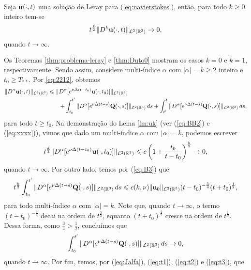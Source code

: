 \begin{tbox} \label{thm:leraygen}
    Seja $\mathbf{u}(\cdot,t)$ uma solução de Leray para (\ref{eq:navierstokes}), então, para todo $k \geqslant 0$ inteiro tem-se
    \[
        t^{\frac{k}{2}} \Vert D^k\mathbf{u}(\cdot,t) \Vert_{\mathcal{L}^2(\mathbb{R}^3)} \to 0,
    \]
    quando $t \to \infty$.
\end{tbox}
\begin{prf}
    Os Teoremas \ref{thm:problema-leray} e \ref{thm:Duto0} mostram os casos $k = 0$ e $k = 1$, respectivamente. Sendo assim, considere multi-índice $\alpha$ com $|\alpha| = k \geqslant 2$ inteiro e $t_0 \geqslant T_{**}$.
    Por \ref{eq:2212}, obtemos
    \[
        \begin{aligned}
            \Vert D^\alpha \mathbf{u}(\cdot,t) \Vert_{\mathcal{L}^2(\mathbb{R}^3)} \leqslant \Vert &D^\alpha[e^{\nu \Delta(t-t_0)} \mathbf{u}(\cdot,t_0)] \Vert_{\mathcal{L}^2(\mathbb{R}^3)}\\  &+ \int_{t_0}^{t'} \Vert D^\alpha[e^{\nu \Delta (t-s)} \mathbf{Q}(\cdot,s)] \Vert_{\mathcal{L}^2(\mathbb{R}^3)} \,ds
        + \int_{t'}^{t} \Vert D^\alpha[e^{\nu \Delta (t-s)} \mathbf{Q}(\cdot,s)] \Vert_{\mathcal{L}^2(\mathbb{R}^3)} \,ds,
        \end{aligned}
    \]
    para todo $t \geqslant t_0$.
    Na demonstração do Lema \ref{lm:uk} (ver (\ref{eq:BB2}) e (\ref{eq:xxxx})), vimos que dado um multi-índice $\alpha$ com $|\alpha| = k$, podemos escrever
    \begin{equation} \label{eq:T1}
        t^{\frac{k}{2}}\Vert D^\alpha [e^{\nu\Delta(t-t_0)}\mathbf{u}(\cdot,t_0)] \Vert_{\mathcal{L}^2(\mathbb{R}^3)} \leqslant c \left( 1 + \frac{t_0}{t - t_0} \right)^{\frac{k}{2}} \to 0,
    \end{equation}
    quando $t \to \infty$.
    Por outro lado, temos por (\ref{eq:B3}) que
    \[
        t^{\frac{k}{2}}\int_{t_0}^{t'} \Vert D^\alpha [e^{\nu\Delta (t-s)}\mathbf{Q}(\cdot,s)] \Vert_{\mathcal{L}^2(\mathbb{R}^3)} \,ds \leqslant c(k,\nu) \Vert \mathbf{u}_0 \Vert_{\mathcal{L}^2(\mathbb{R}^3)} (t - t_0)^{-\frac{3}{4}} (t + t_0)^{\frac{1}{2}},
    \]
    para todo multi-índice $\alpha$ com $|\alpha| = k$.
    Note que, quando $t \to \infty$, o termo $(t - t_0)^{-\frac{3}{4}}$ decai na ordem de $t^{\frac{3}{4}}$, equanto $(t + t_0)^{\frac{1}{2}}$ cresce na ordem de $t^{\frac{1}{2}}$.
    Dessa forma, como $\frac{3}{4} > \frac{1}{2}$, concluímos que
    \begin{equation} \label{eq:T2}
        \int_{t_0}^{t'} \Vert D^\alpha [e^{\nu\Delta (t-s)}\mathbf{Q}(\cdot,s)] \Vert_{\mathcal{L}^2(\mathbb{R}^3)} \,ds  \to 0,
    \end{equation}
    quando $t \to \infty$. 
    Por fim, temos, por (\ref{eq:Jalfa}), (\ref{eq:t1}), (\ref{eq:t2}) e (\ref{eq:t3}), que

\end{prf}

